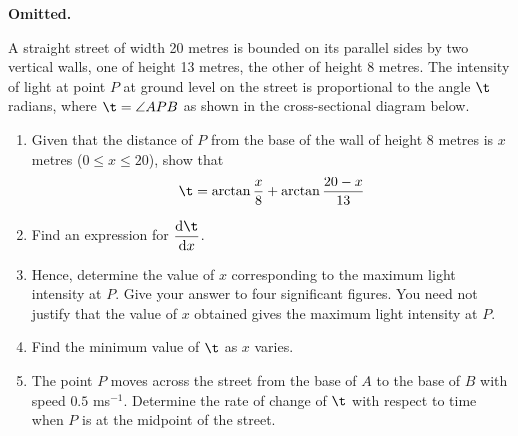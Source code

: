 \documentclass{echw}
\begin{document}
    \problem{}
        \textbf{Omitted.}

    \problem{}
        A straight street of width 20 metres is bounded on its parallel sides by two vertical walls, one of height 13 metres, the other of height 8 metres. The intensity of light at point $P$ at ground level on the street is proportional to the angle $\t$ radians, where $\t = \angle APB$ as shown in the cross-sectional diagram below.

        \begin{center}
        \end{center}

        \begin{enumerate}
            \item Given that the distance of $P$ from the base of the wall of height 8 metres is $x$ metres ($0 \leq x \leq 20$), show that
            \[
                \t = \arctan \dfrac{x}8 + \arctan \dfrac{20-x}{13}
            \]
            \item Find an expression for $\der{\t}{x}$.
            \item Hence, determine the value of $x$ corresponding to the maximum light intensity at $P$. Give your answer to four significant figures. You need not justify that the value of $x$ obtained gives the maximum light intensity at $P$.
            \item Find the minimum value of $\t$ as $x$ varies.
            \item The point $P$ moves across the street from the base of $A$ to the base of $B$ with speed $0.5$ ms$^{-1}$. Determine the rate of change of $\t$ with respect to time when $P$ is at the midpoint of the street.
        \end{enumerate}
\end{document}
